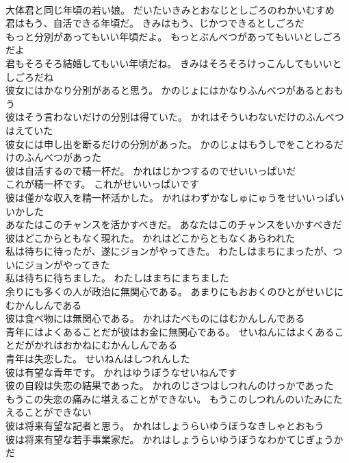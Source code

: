 \documentclass[8pt]{extreport}
\begin{document}
\begin{CJK}{UTF8}{min}
\\	大体君と同じ年頃の若い娘。	だいたいきみとおなじとしごろのわかいむすめ 
\\	君はもう、自活できる年頃だ。	きみはもう、じかつできるとしごろだ 
\\	もっと分別があってもいい年頃だよ。	もっとぶんべつがあってもいいとしごろだよ 
\\	君もそろそろ結婚してもいい年頃だね。	きみはそろそろけっこんしてもいいとしごろだね 
\\	彼女にはかなり分別があると思う。	かのじょにはかなりふんべつがあるとおもう 
\\	彼はそう言わないだけの分別は得ていた。	かれはそういわないだけのふんべつはえていた 
\\	彼女には申し出を断るだけの分別があった。	かのじょはもうしでをことわるだけのふんべつがあった 
\\	彼は自活するので精一杯だ。	かれはじかつするのでせいいっぱいだ 
\\	これが精一杯です。	これがせいいっぱいです 
\\	彼は僅かな収入を精一杯活かした。	かれはわずかなしゅにゅうをせいいっぱいいかした 
\\	あなたはこのチャンスを活かすべきだ。	あなたはこのチャンスをいかすべきだ 
\\	彼はどこからともなく現れた。	かれはどこからともなくあらわれた 
\\	私は待ちに待ったが、遂にジョンがやってきた。	わたしはまちにまったが、ついにジョンがやってきた 
\\	私は待ちに待ちました。	わたしはまちにまちました 
\\	余りにも多くの人が政治に無関心である。	あまりにもおおくのひとがせいじにむかんしんである 
\\	彼は食べ物には無関心である。	かれはたべものにはむかんしんである 
\\	青年にはよくあることだが彼はお金に無関心である。	せいねんにはよくあることだがかれはおかねにむかんしんである 
\\	青年は失恋した。	せいねんはしつれんした 
\\	彼は有望な青年です。	かれはゆうぼうなせいねんです 
\\	彼の自殺は失恋の結果であった。	かれのじさつはしつれんのけっかであった 
\\	もうこの失恋の痛みに堪えることができない。	もうこのしつれんのいたみにたえることができない 
\\	彼は将来有望な記者と思う。	かれはしょうらいゆうぼうなきしゃとおもう 
\\	彼は将来有望な若手事業家だ。	かれはしょうらいゆうぼうなわかてじぎょうかだ 

\end{CJK}
\end{document}
